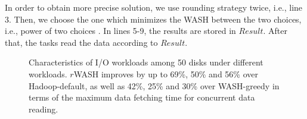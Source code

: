 \documentclass[conference]{IEEEtran}
\begin{document}
In order to obtain more precise solution, we use rounding strategy twice, i.e., line 3. Then, we choose the one which minimizes the WASH between the two choices, i.e., power of two choices \cite{b43}. In lines 5-9, the results are stored in $Result$. After that, the tasks read the data according to $Result$. 

\begin{figure}[!t]
	\centering
	\quad\quad %
	\quad\quad
	\vspace{-1ex}
	\caption{Characteristics of I/O workloads among 50 disks under different workloads. $r$WASH improves by up to 69\%, 50\% and 56\% over Hadoop-default, as well as 42\%, 25\% and 30\% over WASH-greedy in terms of the maximum data fetching time for concurrent data reading.}
	\label{Fig:instance}
\end{figure}
\end{document}
